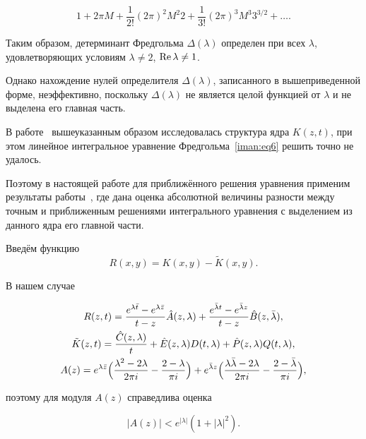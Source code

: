 \[

1 + 2\pi M + \frac{1}{2!}(2\pi)^2 M^2 2 + \frac{1}{3!}(2\pi )^3 M^3 3^{3/2} +  \ldots  .

\]



Таким образом, детерминант Фредгольма $\Delta (\lambda )$ определен при всех $\lambda $, удовлетворяющих условиям $\lambda  \ne 2$, $\mathop{\rm Re} \lambda  \ne 1$. 

Однако нахождение нулей определителя $\Delta (\lambda )$, записанного в вышеприведенной форме, неэффективно, поскольку $\Delta (\lambda )$ не является целой функцией от $\lambda $ и не выделена его главная часть.



В работе~\cite{iman:bib13} вышеуказанным образом исследовалась структура ядра \linebreak $K(z,t)$, при этом линейное интегральное уравнение Фредгольма~\eqref{iman:eq6}  решить точно   не удалось. 

Поэтому в настоящей работе для приближённого решения уравнения применим результаты работы~\cite{iman:bib15}, где дана оценка абсолютной величины разности между точным и приближенным решениями интегрального уравнения с  выделением из данного ядра его главной части.



Введём функцию $$R(x,y) = K(x,y) - \tilde K(x,y).$$ 

В нашем случае

\begin{gather*}

R(z,t) = \frac{e^{\lambda \bar t}  - e^{\lambda \bar z} }{t - z}\hat A(z,\lambda ) + \frac{e^{\bar \lambda t}  - e^{\bar \lambda z} }{t - z}\hat B(z,\bar \lambda ),\\

\tilde K(z,t) = \frac{\hat C(z,\lambda )}{t} + \hat E(z,\lambda )   D(t,\lambda ) + \hat P(z,\lambda )   Q(t,\lambda ),\\

A(z) = e^{\lambda \bar z} \Bigl( \frac{\lambda ^2  - 2\lambda }{2\pi i} - \frac{2 - \lambda }{\pi i} \Bigr) + e^{\bar \lambda z} \Bigl( \frac{\lambda \bar \lambda  - 2\lambda }{2\pi i} - \frac{2 - \bar \lambda }{\pi i} \Bigr),

\end{gather*}

поэтому для модуля $A(z)$ справедлива оценка

\[

|A(z)| < e^{|\lambda |} \left(1 + |\lambda |^2 \right).

\]



